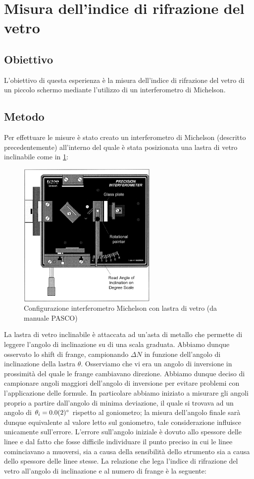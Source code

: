 \documentclass[a4paper]{article}
\begin{document}
\section{Misura dell'indice di rifrazione del vetro}
\subsection{Obiettivo}
L'obiettivo di questa esperienza è la misura dell'indice di rifrazione del vetro di un piccolo schermo mediante l'utilizzo di un interferometro di Michelson.
\subsection{Metodo}
Per effettuare le misure è stato creato un interferometro di Michelson (descritto precedentemente) all'interno del quale è stata posizionata una lastra di vetro inclinabile come in \cref{fig:michelson-vetro}:
\begin{figure}[htbp]
\centering
\includegraphics[width=0.6\textwidth]{./grafici/Michaelson vetro.png}
\caption{Configurazione interferometro Michelson con lastra di vetro (da manuale PASCO)}
\label{fig:michelson-vetro}
\end{figure}
La lastra di vetro inclinabile è attaccata ad un'asta di metallo che permette di leggere l'angolo di inclinazione su di una scala graduata. Abbiamo dunque osservato lo shift di frange, campionando $\Delta N$ in funzione dell'angolo di inclinazione della lastra $\theta$. Osserviamo che vi era un angolo di inversione in prossimità del quale le frange cambiavano direzione. Abbiamo dunque deciso di campionare angoli maggiori dell'angolo di inversione per evitare problemi con l'applicazione delle formule. In particolare abbiamo iniziato a misurare gli angoli proprio a partire dall'angolo di minima deviazione, il quale si trovava ad un angolo di $\theta_i = \SI{0 \pm 0.2}{\degree}$ rispetto al goniometro; la misura dell'angolo finale sarà dunque equivalente al valore letto sul goniometro, tale considerazione influisce unicamente sull'errore. L'errore sull'angolo iniziale è dovuto allo spessore delle linee e dal fatto che fosse difficile individuare il punto preciso in cui le linee cominciavano a muoversi, sia a causa della sensibilità dello strumento sia a causa dello spessore delle linee stesse. La relazione che lega l'indice di rifrazione del vetro all'angolo di inclinazione e al numero di frange è la seguente:
\end{document}
